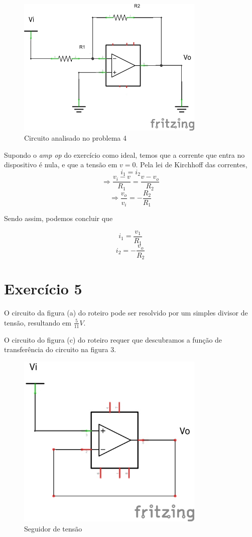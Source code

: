 \documentclass[12pt, a4paper, twoside]{article}
\begin{document}
\begin{figure}
    \centering
    \includegraphics[width=0.8\textwidth]{figs/ex4.jpg}
    \caption{Circuito analisado no problema 4}
\end{figure}

Supondo o \textit{amp op} do exercício como ideal, temos que a corrente que entra no dispositivo é nula, e que a tensão em $v = 0$. Pela lei de Kirchhoff das correntes,
$$  i_1 = i_2 $$
$$ \Rightarrow \frac{v_i - v}{R_1} = \frac{v - v_o}{R_2} $$
$$ \Rightarrow \frac{v_o}{v_i} = -\frac{R_2}{R_1} $$

Sendo assim, podemos concluir que

$$ i_1 = \frac{v_1}{R_1} $$
$$ i_2 = -\frac{v_o}{R_2} $$

\section{Exercício 5}

O circuito da figura (a) do roteiro pode ser resolvido por um simples divisor de tensão, resultando em $\frac{5}{11}V$.

O circuito do figura (c) do roteiro requer que descubramos a função de transferência do circuito na figura 3.

\begin{figure}
    \centering
    \includegraphics[width=0.8\textwidth]{figs/ex5.jpg}
    \caption{Seguidor de tensão}
\end{figure}
\end{document}
